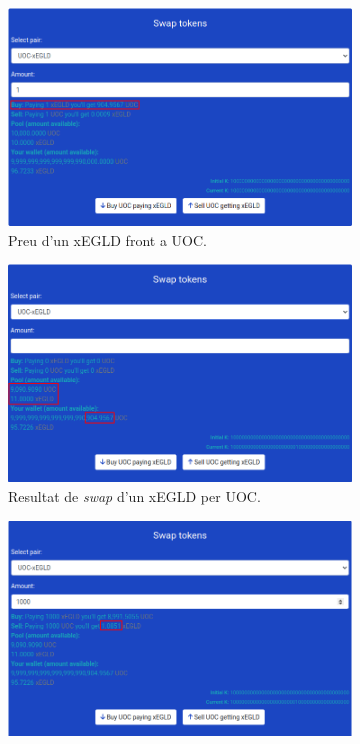 \documentclass[11pt,a4paper]{article}
\begin{document}
\begin{figure}[!htb]
	\begin{subfigure}[b]{0.47\textwidth}
	  \includegraphics[width=\linewidth]{imp-price1.png}
	  \caption{Preu d'un xEGLD front a UOC.}\label{fig:imp-price1}
	\end{subfigure}\hfill
	\begin{subfigure}[b]{0.47\textwidth}
	  \includegraphics[width=\linewidth]{imp-price2.png}
	  \caption{Resultat de \textit{swap} d'un xEGLD per UOC.}\label{fig:imp-price2}
	\end{subfigure}\hfill
	\begin{subfigure}[b]{0.47\textwidth}
	  \includegraphics[width=\linewidth]{imp-price3.png}

\end{subfigure}
\end{figure}
\end{document}
